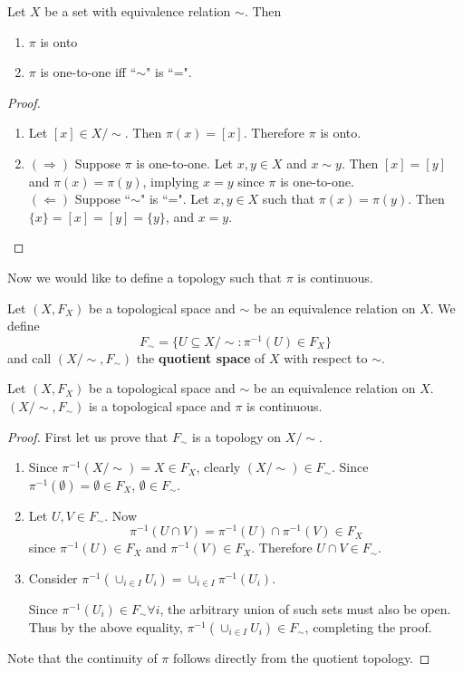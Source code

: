 \begin{tinyfact}
	Let $X$ be a set with equivalence relation $\sim$. Then 
	\begin{enumerate}
		\item $\pi$ is onto 
		\item $\pi$ is one-to-one iff ``$\sim$" is ``=". 
	\end{enumerate}
\end{tinyfact}
\begin{proof}
	\begin{enumerate}
		\item Let $[x] \in X /\!\sim$. Then $\pi(x) = [x]$. Therefore $\pi$ is onto. 
		\item $(\Rightarrow)$ Suppose $\pi$ is one-to-one. Let $x,y \in X$ and $x \sim y$. Then $[x] = [y]$ and $\pi(x) = \pi(y)$, implying $x = y$ since $\pi$ is one-to-one.\\
		$(\Leftarrow)$ Suppose ``$\sim$" is ``=". Let $x,y \in X$ such that $\pi(x) = \pi(y)$. Then $\{x\} = [x] = [y] = \{y\}$, and $x = y$. 
	\end{enumerate}
\end{proof}

Now we would like to define a topology such that $\pi$ is continuous. 
\begin{definition}
	Let $(X, F_X)$ be a topological space and $\sim$ be an equivalence relation on $X$. We define
	\[F_{\sim} = \{U \subseteq X /\!\sim : \pi^{-1}(U) \in F_X\}\]
	and call $(X /\!\sim, F_{\sim})$ the \textbf{quotient space} of $X$ with respect to $\sim$. 
\end{definition}
\begin{smallfact}
	Let $(X, F_X)$ be a topological space and $\sim$ be an equivalence relation on $X$. $(X /\!\sim, F_{\sim})$ is a topological space and $\pi$ is continuous. 
\end{smallfact}
\begin{proof}
	First let us prove that $F_{\sim}$ is a topology on $X /\!\sim$. 
	\begin{enumerate}
		\item Since $\pi^{-1}(X /\!\sim) = X \in F_X$, clearly $(X /\!\sim) \in F_{\sim}$. Since $\pi^{-1}(\emptyset) = \emptyset \in F_X$, $\emptyset \in F_{\sim}$. 
		\item Let $U, V \in F_{\sim}$. Now $$\pi^{-1}(U \cap V) = \pi^{-1}(U) \cap \pi^{-1}(V) \in F_X$$ since $ \pi^{-1}(U) \in F_X$ and $\pi^{-1}(V) \in F_X$. Therefore $U \cap V \in F_{\sim}$. 
		\item Consider $\pi^{-1}(\cup_{i \in I}U_{i}) = \cup_{i \in I} \pi^{-1}(U_{i})$.
		
		Since $\pi^{-1}(U_{i}) \in F_{\sim} \forall i$, the arbitrary union of such sets must also be open. Thus by the above equality, $\pi^{-1}(\cup_{i \in I}U_{i}) \in F_{\sim}$, completing the proof. 
	\end{enumerate}
	Note that the continuity of $\pi$ follows directly from the quotient topology. 
\end{proof}

